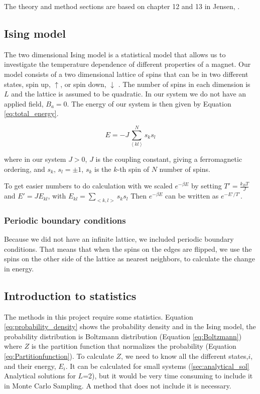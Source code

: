 The theory and method sections are based on chapter 12 and 13 in Jensen, \cite{Jensen}.

\subsection{Ising model}

The two dimensional Ising model is a statistical model that allows us to investigate the temperature dependence of different properties of a magnet. Our model consists of a two dimensional lattice of spins that can be in two different states, spin up, $\uparrow$, or spin down, $\downarrow$ \cite{Ising}. The number of spins in each dimension is $L$ and the lattice is assumed to be quadratic. In our system we do not have an applied field, $B_a = 0$. The energy of our system is then given by Equation \ref{eq:total_energy}.

\begin{equation}\label{eq:total_energy}
E = - J \sum^N_{\left< kl \right>} s_k s_l
\end{equation}

where in our system $J > 0$, $J$ is the coupling constant, giving a ferromagnetic ordering, and $s_k, \, s_l = \pm 1$, $s_k$ is the $k$-th spin of $N$ number of spins.

To get easier numbers to do calculation with we scaled $ e^{-\beta E} $ by setting $ T' = \frac{k_B T	}{J} $ and $ E' = JE_{kl} $, with $ E_{kl} = \sum\limits_{<k,l>} s_ks_l $ Then $e^{-\beta E} $ can be written as $ e^{-E'/T'} $.

\subsubsection{Periodic boundary conditions}

Because we did not have an infinite lattice, we included periodic boundary conditions. That means that when the spins on the edges are flipped, we use the spins on the other side of the lattice as nearest neighbors, to calculate the change in energy.

\subsection{Introduction to statistics}

The methods in this project require some statistics. Equation \ref{eq:probability_density} shows the probability density and in the Ising model, the probability distribution is Boltzmann distribution (Equation \ref{eq:Boltzmann}) where $Z$ is the partition function that normalizes the probability (Equation \ref{eq:Partitionfunction}). To calculate $Z$, we need to know all the different states,$i$, and their energy, $E_i$. It can be calculated for small systems (\ref{sec:analytical_sol} Analytical solutions for $L$=2), but it would be very time consuming to include it in Monte Carlo Sampling. A method that does not include it is necessary.

